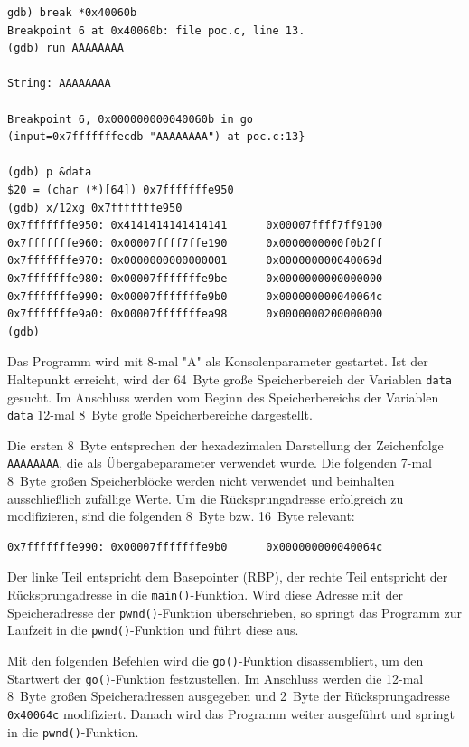 \begin{lstlisting}[basicstyle=\ttfamily\footnotesize]
gdb) break *0x40060b
Breakpoint 6 at 0x40060b: file poc.c, line 13.
(gdb) run AAAAAAAA

String: AAAAAAAA

Breakpoint 6, 0x000000000040060b in go 
(input=0x7fffffffecdb "AAAAAAAA") at poc.c:13}

(gdb) p &data
$20 = (char (*)[64]) 0x7fffffffe950
(gdb) x/12xg 0x7fffffffe950
0x7fffffffe950: 0x4141414141414141      0x00007ffff7ff9100
0x7fffffffe960: 0x00007ffff7ffe190      0x0000000000f0b2ff
0x7fffffffe970: 0x0000000000000001      0x000000000040069d
0x7fffffffe980: 0x00007fffffffe9be      0x0000000000000000
0x7fffffffe990: 0x00007fffffffe9b0      0x000000000040064c
0x7fffffffe9a0: 0x00007fffffffea98      0x0000000200000000
(gdb)
\end{lstlisting}

Das Programm wird mit 8-mal "A" als Konsolenparameter gestartet. Ist der Haltepunkt erreicht, wird der \SI{64}{Byte} große Speicherbereich der Variablen \texttt{data} gesucht. Im Anschluss werden vom Beginn des Speicherbereichs der Variablen \texttt{data} 12-mal \SI{8}{Byte} große Speicherbereiche dargestellt. 

Die ersten \SI{8}{Byte} entsprechen der hexadezimalen Darstellung der Zeichenfolge \texttt{AAAAAAAA}, die als Übergabeparameter verwendet wurde. Die folgenden 7-mal \SI{8}{Byte} großen Speicherblöcke werden nicht verwendet und beinhalten ausschließlich zufällige Werte. Um die Rücksprungadresse erfolgreich zu modifizieren, sind die folgenden \SI{8}{Byte} bzw. \SI{16}{Byte} relevant:

\begin{lstlisting}[basicstyle=\ttfamily\footnotesize]
0x7fffffffe990: 0x00007fffffffe9b0      0x000000000040064c
\end{lstlisting}

Der linke Teil entspricht dem Basepointer (RBP), der rechte Teil entspricht 
der Rücksprungadresse in die \texttt{main()}-Funktion. Wird diese Adresse 
mit der Speicheradresse der \texttt{pwnd()}-Funktion überschrieben, so 
springt das Programm zur Laufzeit in die \texttt{pwnd()}-Funktion und 
führt diese aus.
 
\newpage 
Mit den folgenden Befehlen wird die \texttt{go()}-Funktion disassembliert, 
um den Startwert der \texttt{go()}-Funktion festzustellen. Im Anschluss 
werden die 12-mal \SI{8}{Byte} großen Speicheradressen 
ausgegeben und  \SI{2}{Byte} der Rücksprungadresse \texttt{0x40064c} modifiziert. 
Danach wird das Programm weiter ausgeführt und springt in die 
\texttt{pwnd()}-Funktion.

